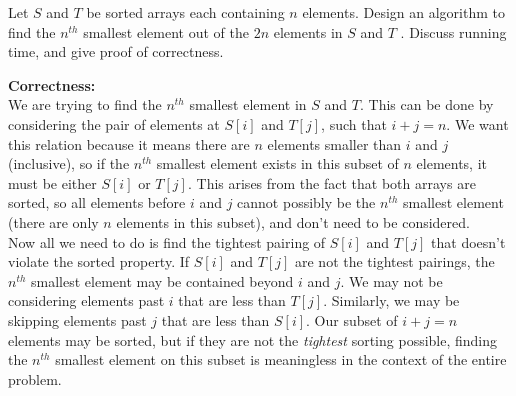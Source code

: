 \documentclass[answers]{exam}
\begin{document}
\begin{questions}
\vspace{0.2in}


\question[20]
Let $S$ and $T$ be sorted arrays each containing $n$ elements. Design an algorithm to find the $n^{th}$ smallest element out of the $2n$ elements in $S$ and $T$ .
Discuss running time, and give proof of correctness.

\begin{algorithm}
	\DontPrintSemicolon
\end{algorithm}

{\bf Correctness:}\\
We are trying to find the $n^{th}$ smallest element in $S$ and $T$. This can be done by considering the pair of elements at $S[i]$ and $T[j]$, such that $i + j = n$. We want this relation because it means there are $n$ elements smaller than $i$ and $j$ (inclusive), so if the $n^{th}$ smallest element exists in this subset of $n$ elements, it must be either $S[i]$ or $T[j]$. This arises from the fact that both arrays are sorted, so all elements before $i$ and $j$ cannot possibly be the $n^{th}$ smallest element (there are only $n$ elements in this subset), and don't need to be considered.\\


Now all we need to do is find the tightest pairing of $S[i]$ and $T[j]$ that doesn't violate the sorted property. If $S[i]$ and $T[j]$ are not the tightest pairings, the $n^{th}$ smallest element may be contained beyond $i$ and $j$. We may not be considering elements past $i$ that are less than $T[j]$. Similarly, we may be skipping elements past $j$ that are less than $S[i]$. Our subset of $i + j = n$ elements may be sorted, but if they are not the {\em tightest} sorting possible, finding the $n^{th}$ smallest element on this subset is meaningless in the context of the entire problem.\\


\end{questions}
\end{document}
